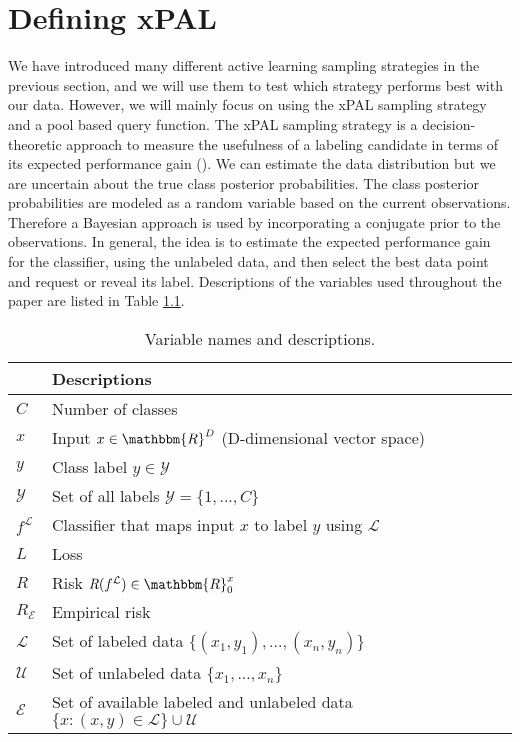 \chapter{Defining xPAL}

We have introduced many different active learning sampling strategies in the previous section, and we will use them to test which strategy performs best with our data. However, we will mainly focus on using the xPAL sampling strategy and a pool based query function. The xPAL sampling strategy is a decision-theoretic approach to measure the usefulness of a labeling candidate in terms of its expected performance gain (\cite{kottke2021toward}). We can estimate the data distribution but we are uncertain about the true class posterior probabilities. The class posterior probabilities are modeled as a random variable based on the current observations. Therefore a Bayesian approach is used by incorporating a conjugate prior to the observations. In general, the idea is to estimate the expected performance gain for the classifier, using the unlabeled data, and then select the best data point and request or reveal its label. Descriptions of the variables used throughout the paper are listed in Table \ref{tab:var_defs}.

\begin{table}[ht]
\centering
\renewcommand{\arraystretch}{1.2}
\begin{tabular}{|l|l|}
\hline
{} & \textbf{Descriptions} \\
\hline
$C$                         & Number of classes \\
\hline
$x$                         & Input $x \in \mathbbm{R}^D$ (D-dimensional vector space)\\
\hline
$y$                         & Class label $y \in \mathcal{Y}$ \\
\hline
$\mathcal{Y}$               & Set of all labels $\mathcal{Y} = \{ 1,...,C \}$ \\
\hline
$f^{\mathcal{L}}$           & Classifier that maps input $x$ to label $y$ using $\mathcal{L}$ \\
\hline
$\textit{L}$                & Loss\\
\hline
$\textit{R}$                & Risk $\textit{R}(f^{\mathcal{L}}) \in \mathbbm{R}_0^x$ \\
\hline
$\textit{R}_{\mathcal{E}}$  & Empirical risk\\
\hline
$\mathcal{L}$               & Set of labeled data $\{(x_1,y_1),...,(x_n,y_n)\}$ \\
\hline
$\mathcal{U}$               & Set of unlabeled data $\{x_1,...,x_n\}$ \\
\hline
$\mathcal{E}$               & Set of available labeled and unlabeled data $\{x : (x,y) \in \mathcal{L}\} \cup \mathcal{U}$ \\
\hline
\end{tabular}
\caption{Variable names and descriptions.}
\label{tab:var_defs}
\end{table}

